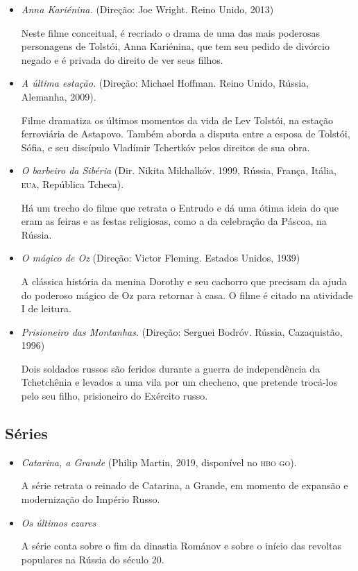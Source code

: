 \documentclass[11pt]{extarticle}
\begin{document}
\begin{itemize}

\item\textit{Anna Kariénina.} (Direção: Joe Wright. Reino Unido, 2013)

Neste filme conceitual, é recriado o drama
de uma das mais poderosas personagens de Tolstói, Anna Kariénina, que tem
seu pedido de divórcio negado e é privada do direito de ver seus filhos.

\item\textit{A última estação.} (Direção: Michael Hoffman. Reino Unido, Rússia,
Alemanha, 2009).

Filme dramatiza os últimos momentos da vida de Lev Tolstói, na estação
ferroviária de Astapovo. Também aborda a disputa entre a esposa de
Tolstói, Sófia, e seu discípulo Vladímir Tchertkóv pelos direitos de sua
obra.

\item\emph{O barbeiro da Sibéria} (Dir. Nikita Mikhalkóv. 1999, Rússia,
França, Itália, \textsc{eua}, República Tcheca).

Há um trecho do filme que
retrata o Entrudo e dá uma ótima ideia do que eram as feiras e as festas
religiosas, como a da celebração da Páscoa, na Rússia.

\item \emph{O mágico de Oz} (Direção: Victor Fleming. Estados Unidos, 1939)

A clássica história da menina Dorothy e seu cachorro que precisam da ajuda do poderoso mágico de Oz para retornar à casa. O filme é citado na atividade I de leitura.

\item \emph{Prisioneiro das Montanhas}. (Direção: Serguei Bodróv. Rússia,
Cazaquistão, 1996)

Dois soldados russos são feridos durante a guerra de independência da Tchetchênia e levados a uma vila por um checheno, que pretende trocá-los pelo seu filho, prisioneiro do Exército russo.

\end{itemize}

\subsection{Séries}

\begin{itemize}

\item \emph{Catarina, a Grande} (Philip Martin, 2019, disponível no \textsc{hbo go}).

A série retrata o reinado de Catarina, a Grande, em momento de expansão e modernização do Império Russo.

\item \emph{Os últimos czares}

A série conta sobre o fim da dinastia Románov e sobre o início das revoltas populares na Rússia do século 20.

\end{itemize}
\end{document}

